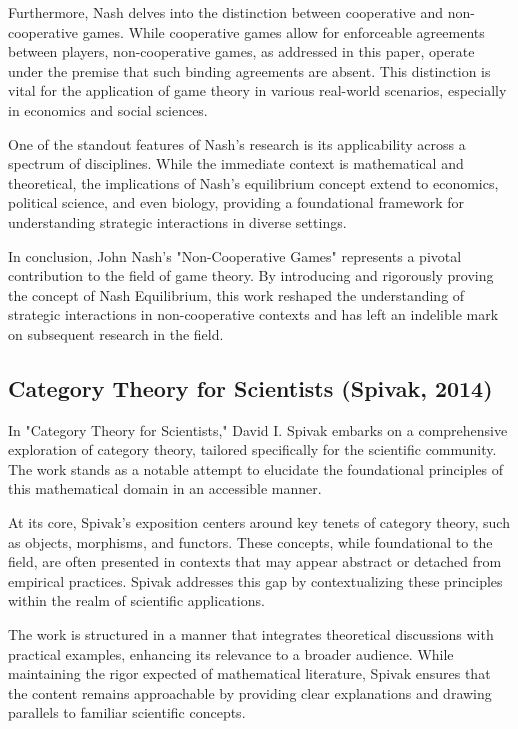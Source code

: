 \documentclass[sn-nature]{sn-jnl}%
\theoremstyle{thmstyleone}%
\theoremstyle{thmstyletwo}%
\theoremstyle{thmstylethree}%
\begin{document}
Furthermore, Nash delves into the distinction between cooperative and non-cooperative games. While cooperative games allow for enforceable agreements between players, non-cooperative games, as addressed in this paper, operate under the premise that such binding agreements are absent. This distinction is vital for the application of game theory in various real-world scenarios, especially in economics and social sciences.

One of the standout features of Nash's research is its applicability across a spectrum of disciplines. While the immediate context is mathematical and theoretical, the implications of Nash's equilibrium concept extend to economics, political science, and even biology, providing a foundational framework for understanding strategic interactions in diverse settings.

In conclusion, John Nash's "Non-Cooperative Games" represents a pivotal contribution to the field of game theory. By introducing and rigorously proving the concept of Nash Equilibrium, this work reshaped the understanding of strategic interactions in non-cooperative contexts and has left an indelible mark on subsequent research in the field.
\subsection{Category Theory for Scientists (Spivak, 2014)\cite{spivak_category_2014}}

In "Category Theory for Scientists," David I. Spivak embarks on a comprehensive exploration of category theory, tailored specifically for the scientific community. The work stands as a notable attempt to elucidate the foundational principles of this mathematical domain in an accessible manner.

At its core, Spivak's exposition centers around key tenets of category theory, such as objects, morphisms, and functors. These concepts, while foundational to the field, are often presented in contexts that may appear abstract or detached from empirical practices. Spivak addresses this gap by contextualizing these principles within the realm of scientific applications.

The work is structured in a manner that integrates theoretical discussions with practical examples, enhancing its relevance to a broader audience. While maintaining the rigor expected of mathematical literature, Spivak ensures that the content remains approachable by providing clear explanations and drawing parallels to familiar scientific concepts.
\end{document}
